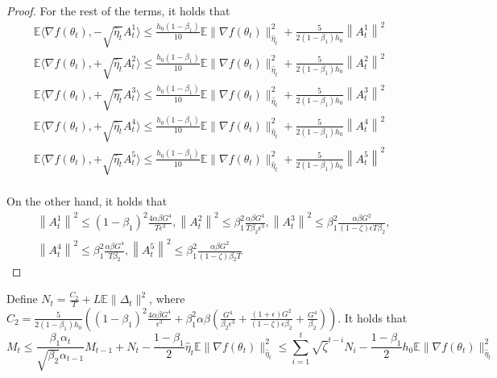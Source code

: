 \begin{proof}
For the rest of the terms, it holds that
\[
\begin{split}
    \mathbb{E} \langle \nabla f(\theta_t), -\sqrt{\hat{\eta}_t} A_t^1 \rangle \leq \frac{h_0(1-\beta_1)}{10}\mathbb{E} \|\nabla f(\theta_t)\|_{\hat{\eta}_t}^2 + \frac{5}{2(1-\beta_1)h_0}\left\|A_t^1\right\|^2\\
    \mathbb{E} \langle \nabla f(\theta_t), +\sqrt{\hat{\eta}_t} A_t^2 \rangle \leq \frac{h_0(1-\beta_1)}{10}\mathbb{E} \|\nabla f(\theta_t)\|_{\hat{\eta}_t}^2 + \frac{5}{2(1-\beta_1)h_0}\left\|A_t^2\right\|^2\\
    \mathbb{E} \langle \nabla f(\theta_t), +\sqrt{\hat{\eta}_t} A_t^3 \rangle \leq \frac{h_0(1-\beta_1)}{10}\mathbb{E} \|\nabla f(\theta_t)\|_{\hat{\eta}_t}^2 + \frac{5}{2(1-\beta_1)h_0}\left\|A_t^3\right\|^2\\
    \mathbb{E} \langle \nabla f(\theta_t), +\sqrt{\hat{\eta}_t} A_t^4 \rangle \leq \frac{h_0(1-\beta_1)}{10}\mathbb{E} \|\nabla f(\theta_t)\|_{\hat{\eta}_t}^2 + \frac{5}{2(1-\beta_1)h_0}\left\|A_t^4\right\|^2\\
    \mathbb{E} \langle \nabla f(\theta_t), +\sqrt{\hat{\eta}_t} A_t^5 \rangle \leq \frac{h_0(1-\beta_1)}{10}\mathbb{E} \|\nabla f(\theta_t)\|_{\hat{\eta}_t}^2 + \frac{5}{2(1-\beta_1)h_0}\left\|A_t^5\right\|^2\\
\end{split}
    \]

On the other hand, it holds that
\[
\begin{split}
&\left\|A_t^1\right\|^2 \leq (1-\beta_1)^2 \frac{4\alpha\beta G^4}{T \epsilon^3}, 
\left\|A_t^2\right\|^2 \leq \beta_1^2 \frac{\alpha \beta G^4}{T\beta_2 \epsilon^3}, 
\left\|A_t^3\right\|^2 \leq \beta_1^2 \frac{\alpha \beta G^2}{(1-\zeta) \epsilon T \beta_2},\\
&\left\|A_t^4\right\|^2 \leq \beta_1^2 \frac{\alpha \beta G^4}{T \beta_2}, 
\left\|A_t^5\right\|^2 \leq \beta_1^2 \frac{\alpha \beta G^2}{(1-\zeta) \beta_2  T}
\end{split}
\]
\end{proof}

Define $N_t = \frac{C_2}{T}+ L\mathbb{E}\|\Delta_t\|^2$, where $C_2 = \frac{5}{2(1-\beta_1)h_0 } \left((1-\beta_1)^2 \frac{4\alpha \beta G^4}{\epsilon^3} + \beta_1^2 \alpha\beta \left(\frac{G^4}{\beta_2 \epsilon^3} + \frac{(1+\epsilon) G^2}{(1-\zeta) \epsilon \beta_2} + \frac{G^4}{\beta_2}\right)\right)$.
It holds that
\[
    M_t \leq \frac{\beta_1\alpha_t}{\sqrt{\beta_2}\alpha_{t-1}}M_{t-1} + N_t - \frac{1-\beta_1}{2} \hat{\eta}_t \mathbb{E} \|\nabla f(\theta_t)\|^2_{\hat{\eta}_t}
    \leq \sum_{i=1}^t \sqrt{\zeta}^{t-i} N_i - \frac{1-\beta_1}{2} h_0 \mathbb{E} \|\nabla f(\theta_t)\|_{\hat{\eta}_t}^2 
\]

